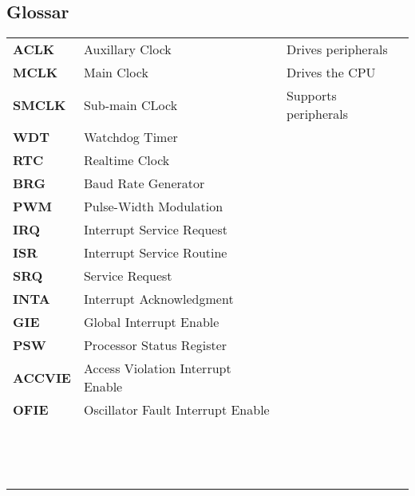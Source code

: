 \subsection*{Glossar}
\begin{tabular}{>{\bfseries}lll}
    ACLK    & Auxillary Clock   & Drives peripherals\\
    MCLK    & Main Clock        & Drives the CPU \\
    SMCLK   & Sub-main CLock    & Supports peripherals\\
    WDT     & Watchdog Timer    & \\
    RTC     & Realtime Clock    & \\
    BRG     & Baud Rate Generator& \\
    PWM     & Pulse-Width Modulation& \\
    IRQ     & Interrupt Service Request& \\
    ISR     & Interrupt Service Routine& \\
    SRQ     & Service Request   & \\
    INTA    & Interrupt Acknowledgment& \\
    GIE     & Global Interrupt Enable & \\
    PSW     & Processor Status Register & \\
    ACCVIE  & Access Violation Interrupt Enable & \\
    OFIE    & Oscillator Fault Interrupt Enable & \\
    & & \\
    & & \\
    & & \\
    & & \\
    & & \\
    & & \\
    & & \\
    & & \\
    & & \\
    & & \\
    & & \\
    & & \\
    & & \\
    & & \\
\end{tabular}